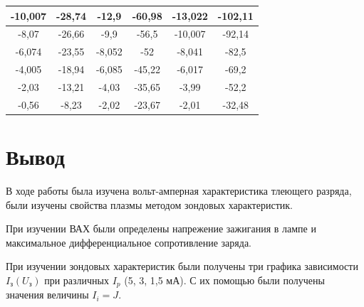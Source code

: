 \documentclass[a4paper]{article}
\theoremstyle{definition}
\theoremstyle{remark}
\begin{document}
\begin{table}[h!]
\begin{tabular}{|c|c|c|c|c|c|}
        -10,007      & -28,74        & -12,9       & -60,98      & -13,022     & -102,11     \\ \hline
        -8,07        & -26,66        & -9,9        & -56,5       & -10,007     & -92,14      \\ \hline
        -6,074       & -23,55        & -8,052      & -52         & -8,041      & -82,5       \\ \hline
        -4,005       & -18,94        & -6,085      & -45,22      & -6,017      & -69,2       \\ \hline
        -2,03        & -13,21        & -4,03       & -35,65      & -3,99       & -52,2       \\ \hline
        -0,56        & -8,23         & -2,02       & -23,67      & -2,01       & -32,48      \\ \hline
        \end{tabular}
        \end{table}

\section{Вывод}

        В ходе работы была изучена вольт-амперная характеристика тлеющего разряда, были изучены свойства плазмы методом зондовых характеристик. \medskip

        При изучении ВАХ были определены напрежение зажигания в лампе и максимальное дифференциальное сопротивление заряда. \medskip

        При изучении зондовых характеристик были получены три графика зависимости $I_{\text{з}}(U_{\text{з}})$ при различных $I_p$ (5, 3, 1,5 мА). С их помощью были получены значения величины $I_i = J$. \medskip
\end{document}
